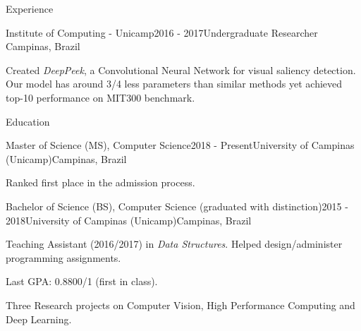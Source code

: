 \documentclass[8pt]{resume}
\newcommand{\tit}[1]{\textit{#1}}
\begin{document}
\begin{rSection}{Experience}
\begin{rSubsection}{Institute of Computing - Unicamp}{2016 - 2017}{Undergraduate Researcher}
    {Campinas, Brazil}
    \item Created \tit{DeepPeek}, a Convolutional Neural Network for visual saliency detection.
        Our model has around 3/4 less parameters than similar methods yet
        achieved top-10 performance on MIT300 benchmark.
\end{rSubsection}
\end{rSection}

\begin{rSection}{Education}
\begin{rSubsection}{Master of Science (MS), Computer Science}{2018 - Present}{University of Campinas (Unicamp)}{Campinas, Brazil}
    \item Ranked first place in the admission process.
\end{rSubsection}

\begin{rSubsection}{Bachelor of Science (BS), Computer Science (graduated with distinction)}{2015 - 2018}{University of Campinas (Unicamp)}{Campinas, Brazil}
    \item Teaching Assistant (2016/2017) in \tit{Data Structures}. Helped
        design/administer programming assignments.
    \item Last GPA: 0.8800/1 (first in class).
    \item Three Research projects on Computer Vision, High Performance Computing and Deep Learning.
\end{rSubsection}
\end{rSection}
\end{document}
